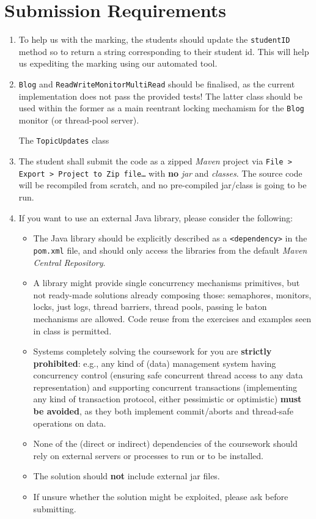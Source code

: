 \documentclass{article}
\begin{document}
	\section*{Submission Requirements}
	\begin{enumerate}
\item To help us with the marking, the students should update the \texttt{studentID} method so to return a string corresponding to their student id. This will help us expediting the marking using our automated tool.
		\item \texttt{Blog} and \texttt{ReadWriteMonitorMultiRead} should be finalised, as the current implementation does not pass the provided tests! The latter class should be used within the former as a main reentrant locking mechamism for the \texttt{Blog} monitor (or thread-pool server). 

The \texttt{TopicUpdates} class 
		\item The student shall submit the code as a zipped \textit{Maven} project via \texttt{File > Export > Project to Zip file\dots} with \textbf{no} \textit{jar} and \textit{classes}. The source code will be recompiled from scratch, and no pre-compiled jar/class is going to be run.
		 
		\item If you want to use an external Java library, please consider the following:
		\begin{itemize}
			\item The Java library should be explicitly described as a \texttt{<dependency>} in the \texttt{pom.xml} file, and should only access the libraries from the default \textit{Maven Central Repository}.
			\item A library might provide single concurrency mechanisms primitives, but not ready-made solutions already composing those: semaphores, monitors, locks, just logs, thread barriers, thread pools, passing le baton mechanisms are allowed. Code reuse from the exercises and examples seen in class is permitted.
			
			\item Systems completely solving the coursework for you are \textbf{strictly prohibited}: e.g., any kind of (data) management system having concurrency control (ensuring safe concurrent thread access to any data representation) and supporting concurrent transactions (implementing any kind of transaction protocol, either pessimistic or optimistic) \textbf{must be avoided}, as they both implement commit/aborts and thread-safe operations on data. 
			\item None of the (direct or indirect) dependencies of the coursework should rely on external servers or processes to run or to be installed.
			\item The solution should \textbf{not} include external jar files.
			\item If unsure whether the solution might be exploited, please ask before submitting.
		\end{itemize}
		 

\end{enumerate}
\end{document}

